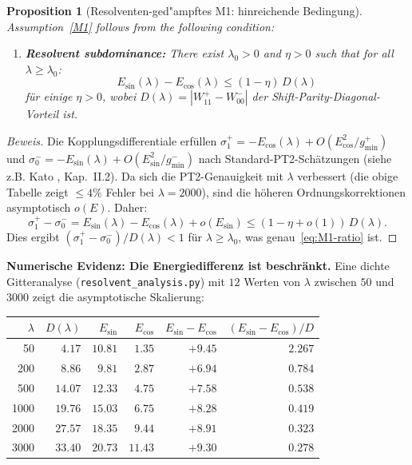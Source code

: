 ﻿\documentclass[12pt,a4paper]{article}
\newtheorem{proposition}[theorem]{Proposition}
\theoremstyle{definition}
\theoremstyle{remark}
\begin{document}
\begin{proposition}[Resolventen-ged"ampftes M1: hinreichende Bedingung]
\label{prop:resolvent-M1}
Assumption~\ref{M1} follows from the following condition:
\begin{enumerate}[label=\textup{(M1$''$)}]
  \item\label{M1pp} \textbf{Resolvent subdominance:} There exist $\lambda_0 > 0$ and $\eta > 0$ such that for all $\lambda \geq \lambda_0$:
  \begin{equation}
  \label{eq:resolvent-subdominance}
    E_{\sin}(\lambda) - E_{\cos}(\lambda) \leq (1 - \eta)\,D(\lambda)
  \end{equation}
  für einige $\eta > 0$, wobei $D(\lambda) = |W_{11}^+ - W_{00}^-|$ der Shift-Parity-Diagonal-Vorteil ist.
\end{enumerate}
\end{proposition}

\begin{proof}[Beweis]
Die Kopplungsdifferentiale erfüllen $\sigma_1^+ = -E_{\cos}(\lambda) + O(E_{\cos}^2/g_{\min}^+)$ und $\sigma_0^- = -E_{\sin}(\lambda) + O(E_{\sin}^2/g_{\min}^-)$ nach Standard-PT2-Schätzungen (siehe z.B. Kato \cite{Kato1995}, Kap.~II.2). Da sich die PT2-Genauigkeit mit $\lambda$ verbessert (die obige Tabelle zeigt $\leq 4\%$ Fehler bei $\lambda = 2000$), sind die höheren Ordnungskorrektionen asymptotisch $o(E)$. Daher:
\[
  \sigma_1^+ - \sigma_0^- = E_{\sin}(\lambda) - E_{\cos}(\lambda) + o(E_{\sin}) \leq (1 - \eta + o(1))\,D(\lambda).
\]
Dies ergibt $(\sigma_1^+ - \sigma_0^-)/D(\lambda) < 1$ für $\lambda \geq \lambda_0$, was genau~\eqref{eq:M1-ratio} ist.
\end{proof}

\noindent\textbf{Numerische Evidenz: Die Energiedifferenz ist beschränkt.} Eine dichte Gitteranalyse (\texttt{resolvent\_analysis.py}) mit $12$ Werten von $\lambda$ zwischen $50$ und $3000$ zeigt die asymptotische Skalierung:

\begin{center}
\small
\renewcommand{\arraystretch}{1.15}
\begin{tabular}{r|r|r|r|r|r}
$\lambda$ & $D(\lambda)$ & $E_{\sin}$ & $E_{\cos}$ & $E_{\sin}\!-\!E_{\cos}$ & $(E_{\sin}\!-\!E_{\cos})/D$ \\\hline
50   & $4.17$  & $10.81$ & $1.35$ & $+9.45$ & $2.267$ \\
200  & $8.86$  & $9.81$  & $2.87$ & $+6.94$ & $0.784$ \\
500  & $14.07$ & $12.33$ & $4.75$ & $+7.58$ & $0.538$ \\
1000 & $19.76$ & $15.03$ & $6.75$ & $+8.28$ & $0.419$ \\
2000 & $27.57$ & $18.35$ & $9.44$ & $+8.91$ & $0.323$ \\
3000 & $33.40$ & $20.73$ & $11.43$ & $+9.30$ & $0.278$
\end{tabular}
\end{center}
\end{document}
